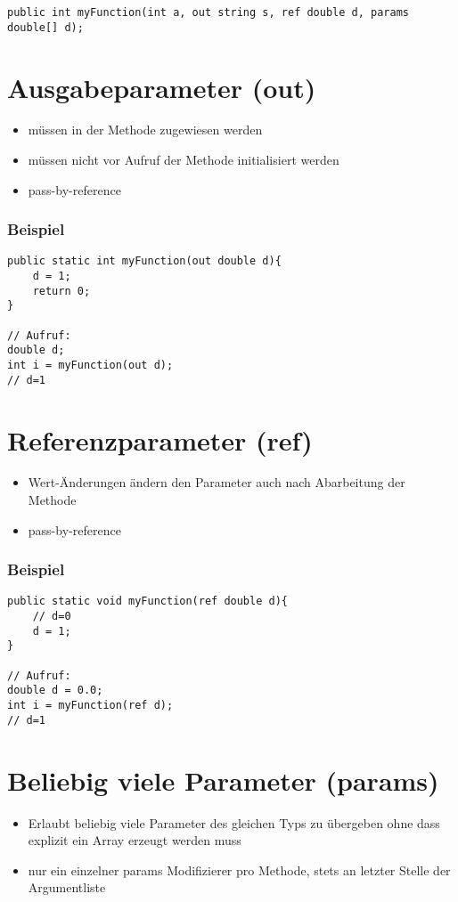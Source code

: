 \lstinline$public int myFunction(int a, out string s, ref double d, params double[] d);$
\section{Ausgabeparameter (out)}
\begin{itemize}
\item müssen in der Methode zugewiesen werden
\item müssen nicht vor Aufruf der Methode initialisiert werden
\item pass-by-reference
\end{itemize}
\subsubsection*{Beispiel}
\begin{lstlisting}[language={[Sharp]C}]
public static int myFunction(out double d){
	d = 1;
	return 0;
}

// Aufruf: 
double d;
int i = myFunction(out d);
// d=1
\end{lstlisting}
\section{Referenzparameter (ref)}
\begin{itemize}
\item Wert-Änderungen ändern den Parameter auch nach Abarbeitung der Methode
\item pass-by-reference
\end{itemize}
\subsubsection*{Beispiel}
\begin{lstlisting}[language={[Sharp]C}]
public static void myFunction(ref double d){
	// d=0
	d = 1;
}

// Aufruf: 
double d = 0.0;
int i = myFunction(ref d);
// d=1
\end{lstlisting}
\section{Beliebig viele Parameter (params)}
\begin{itemize}
\item Erlaubt beliebig viele Parameter des gleichen Typs zu übergeben ohne dass explizit ein Array erzeugt werden muss
\item nur ein einzelner params Modifizierer pro Methode, stets an letzter Stelle der Argumentliste
\end{itemize}
